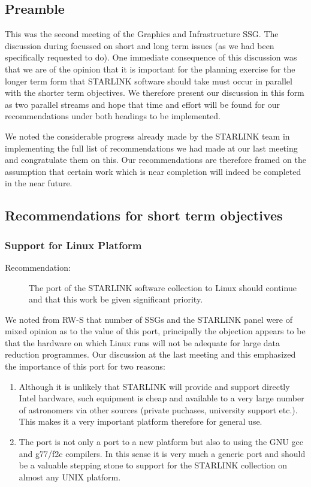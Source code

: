 \subsection{Preamble}

This was the second meeting of the Graphics and Infrastructure SSG.
The discussion during focussed on short and long term issues (as we
had been specifically requested to do).  One immediate consequence of
this discussion was that we are of the opinion that it is important
for the planning exercise for the longer term form that STARLINK
software should take must occur in parallel with the shorter term
objectives.  We therefore present our discussion in this form as two
parallel streams and hope that time and effort will be found for our
recommendations under both headings to be implemented.

We noted the considerable progress already made by the STARLINK team
in implementing the full list of recommendations we had made at our
last meeting and congratulate them on this.  Our recommendations are
therefore framed on the assumption that certain work which is near
completion will indeed be completed in the near future.

\subsection{Recommendations for short term objectives}

\subsubsection{Support for Linux Platform}

\begin{description}
\item[Recommendation:] The port of the STARLINK software collection to
Linux should continue and that this work be given significant
priority.
\end{description}

We noted from RW-S that number of SSGs and the STARLINK panel were of
mixed opinion as to the value of this port, principally the objection
appears to be that the hardware on which Linux runs will not be
adequate for large data reduction programmes.  Our discussion at the
last meeting and this emphasized the importance of this port for two
reasons:

\begin{enumerate}
\item Although it is unlikely that STARLINK will provide and support
directly Intel hardware, such equipment is cheap and available to a
very large number of astronomers via other sources (private puchases,
university support etc.).  This makes it a very important platform
therefore for general use.

\item The port is not only a port to a new platform but also to using
the GNU gcc and g77/f2c compilers.  In this sense it is very much a
generic port and should be a valuable stepping stone to support for
the STARLINK collection on almost any UNIX platform.
\end{enumerate}

